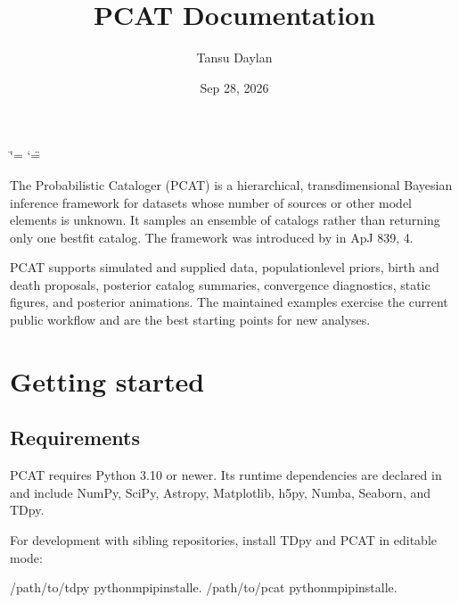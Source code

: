 \documentclass[letterpaper,10pt,english]{sphinxmanual}
\title{PCAT Documentation}
\date{Sep 28, 2026}
\author{Tansu Daylan}
\begin{document}
\ifdefined\shorthandoff
  \ifnum\catcode`\=\string=\active\shorthandoff{=}\fi
  \ifnum\catcode`\"=\active{}\fi
\fi

\pagestyle{empty}
\sphinxmaketitle
\pagestyle{plain}
\sphinxtableofcontents
\pagestyle{normal}
\label{\detokenize{index::doc}}


\sphinxAtStartPar
The Probabilistic Cataloger (PCAT) is a hierarchical, transdimensional Bayesian
inference framework for datasets whose number of sources or other model elements
is unknown. It samples an ensemble of catalogs rather than returning only one
best\sphinxhyphen{}fit catalog. The framework was introduced by  in ApJ 839, 4.

\sphinxAtStartPar
PCAT supports simulated and supplied data, population\sphinxhyphen{}level priors, birth and
death proposals, posterior catalog summaries, convergence diagnostics, static
figures, and posterior animations. The maintained examples exercise the current
public workflow and are the best starting points for new analyses.

\sphinxstepscope


\chapter{Getting started}
\label{\detokenize{getting_started:getting-started}}\label{\detokenize{getting_started::doc}}

\section{Requirements}
\label{\detokenize{getting_started:requirements}}
\sphinxAtStartPar
PCAT requires Python 3.10 or newer. Its runtime dependencies are declared in
 and include NumPy, SciPy, Astropy, Matplotlib, h5py, Numba,
Seaborn, and TDpy.

\sphinxAtStartPar
For development with sibling repositories, install TDpy and PCAT in editable
mode:

\begin{sphinxVerbatim}[commandchars=\\\{\}]
/path/to/tdpy
python\PYGZhy{}mpipinstall\PYGZhy{}e.
/path/to/pcat
python\PYGZhy{}mpipinstall\PYGZhy{}e.
\end{sphinxVerbatim}
\end{document}
